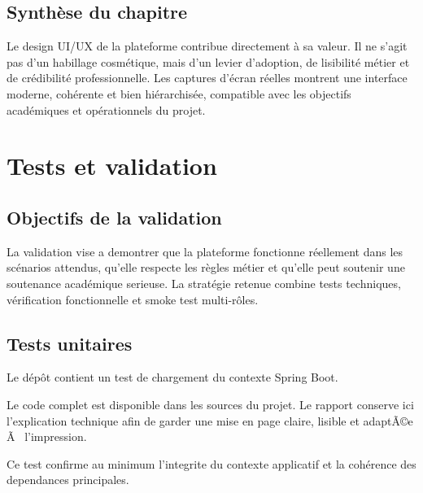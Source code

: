 ﻿\documentclass[12pt,a4paper,oneside]{report}
\newenvironment{codeblock}[1][]{
  \par
  \captionsetup{type=figure}
}{
  \par
}
\begin{document}
\section{Synthèse du chapitre}
Le design UI/UX de la plateforme contribue directement à sa valeur. Il ne s'agit pas d'un habillage cosmétique, mais d'un levier d'adoption, de lisibilité métier et de crédibilité professionnelle. Les captures d'écran réelles montrent une interface moderne, cohérente et bien hiérarchisée, compatible avec les objectifs académiques et opérationnels du projet.









\chapter{Tests et validation}
\label{chap:tests}

\section{Objectifs de la validation}
La validation vise a demontrer que la plateforme fonctionne réellement dans les scénarios attendus, qu'elle respecte les règles métier et qu'elle peut soutenir une soutenance académique serieuse. La stratégie retenue combine tests techniques, vérification fonctionnelle et smoke test multi-rôles.

\section{Tests unitaires}
Le dépôt contient un test de chargement du contexte Spring Boot.

\begin{codeblock}[H]
\caption{Test automatise de chargement du contexte Spring Boot}
\begin{keybox}
Le code complet est disponible dans les sources du projet. Le rapport conserve ici l'explication technique afin de garder une mise en page claire, lisible et adaptÃ©e Ã  l'impression.
\end{keybox}
\end{codeblock}

Ce test confirme au minimum l'integrite du contexte applicatif et la cohérence des dependances principales.
\end{document}
